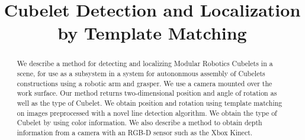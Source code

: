 \documentclass[conference]{IEEEtran}
\begin{document}
%
\title{Cubelet Detection and Localization by Template Matching}


\author{
\and
{}
\and
{}
}









\maketitle


\begin{abstract}
We describe a method for detecting and localizing Modular Robotics Cubelets in a scene, for use as a subsystem in a system for autononmous assembly of Cubelets constructions using a robotic arm and grasper. We use a camera mounted over the work surface. Our method returns two-dimensional position and angle of rotation as well as the type of Cubelet. We obtain position and rotation using template matching on images preprocessed with a novel line detection algorithm. We obtain the type of Cubelet by using color information. We also describe a method to obtain depth information from a camera with an RGB-D sensor such as the Xbox Kinect.
\end{abstract}
\end{document}
